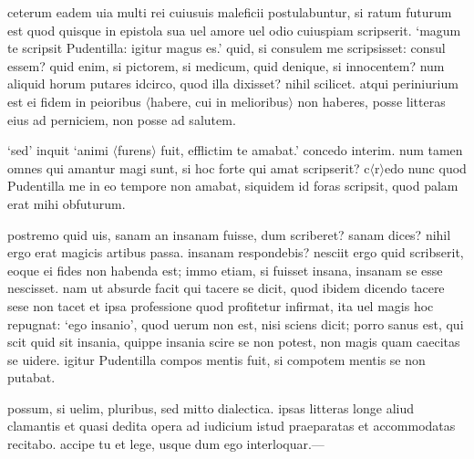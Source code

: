 ceterum eadem uia multi rei cuiusuis maleficii postulabuntur, si ratum futurum est quod quisque in epistola sua uel amore uel odio cuiuspiam scripserit. `magum te scripsit Pudentilla: igitur  magus es.' quid, si consulem me scripsisset: consul essem? quid enim, si pictorem, si medicum, quid denique, si innocentem? num aliquid horum putares idcirco, quod illa dixisset? nihil scilicet. atqui periniurium est ei fidem in peioribus $\langle$habere, cui in melioribus$\rangle$ non haberes, posse litteras eius ad perniciem, non posse ad salutem. 

`sed' inquit `animi $\langle$furens$\rangle$ fuit, efflictim te amabat.' concedo interim. num tamen omnes qui amantur magi sunt, si hoc forte qui amat scripserit? c$\langle$r$\rangle$edo nunc quod Pudentilla me in eo tempore non amabat, siquidem id foras scripsit, quod palam erat mihi obfuturum. 

postremo quid uis, sanam an insanam fuisse, dum scriberet? sanam dices? nihil ergo erat magicis artibus passa. insanam respondebis? nesciit ergo quid scribserit, eoque ei fides non habenda est; immo etiam, si fuisset insana, insanam se esse nescisset. nam ut absurde facit qui tacere se dicit, quod ibidem dicendo tacere sese non tacet et ipsa professione quod profitetur infirmat, ita uel magis hoc repugnat: `ego insanio', quod uerum non est, nisi sciens dicit; porro sanus est, qui scit quid sit insania, quippe insania scire se non potest, non magis quam caecitas se uidere. igitur Pudentilla compos mentis fuit, si compotem mentis se non putabat. 

possum, si uelim, pluribus, sed mitto dialectica. ipsas litteras longe aliud clamantis et quasi dedita opera ad iudicium istud praeparatas et accommodatas recitabo. accipe tu et lege, usque dum ego interloquar.— 
